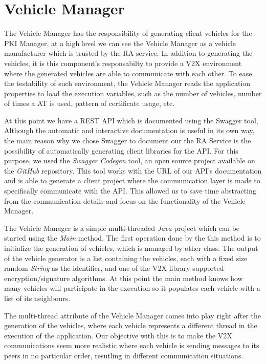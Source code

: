 \section{Vehicle Manager}
The Vehicle Manager has the responsibility of generating client vehicles for the PKI Manager, at a high level we can see the Vehicle Manager as a vehicle manufacturer which is trusted by the RA service. In addition to generating the vehicles, it is this component's responsabilty to provide a V2X environment where the generated vehicles are able to communicate with each other. To ease the testability of such environment, the Vehicle Manager reads the application properties to load the execution variables, such as the number of vehicles, number of times a AT is used, pattern of certificate usage, etc.

At this point we have a REST API which is documented using the Swagger tool, Although the automatic and interactive documentation is useful in its own way, the main reason why we chose Swagger to document our the RA Service is the possibility of automatically generating client libraries for the API. For this purpose, we used the \textit{Swagger Codegen} tool, an open source project available on the \textit{GitHub} repository. This tool works with the URL of our API's documentation and is able to generate a client project where the communication layer is made to specifically communicate with the API. This allowed us to save time abstracting from the communication details and focus on the functionality of the Vehicle Manager.

The Vehicle Manager is a simple multi-threaded \textit{Java} project which can be started using the \textit{Main} method. The first operation done by the this method is to initialize the generation of vehicles, which is managed by other class. The output of the vehicle generator is a list containing the vehicles, each with a fixed size random \textit{String} as the identifier, and one of the V2X library supported encryption/signature algorithms. At this point the main method knows how many vehicles will participate in the execution so it populates each vehicle with a list of its neighbours. 

The multi-thread attribute of the Vehicle Manager comes into play right after the generation of the vehicles, where each vehicle represents a different thread in the execution of the application. Our objective with this is to make the V2X communications seem more realistic where each vehicle is sending messages to its peers in no particular order, resutling in different communication situations. 

